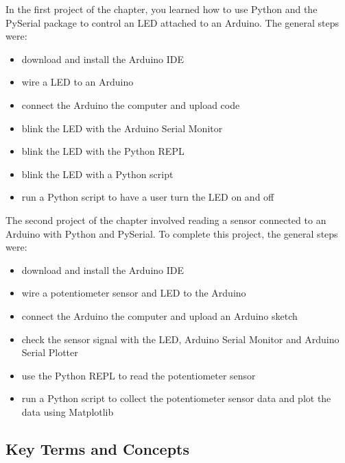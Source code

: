 \documentclass{book}
\providecommand{\tightlist}{%
      \setlength{\itemsep}{0pt}\setlength{\parskip}{0pt}}
\begin{document}
In the first project of the chapter, you learned how to use Python and
the PySerial package to control an LED attached to an Arduino. The
general steps were:

\begin{itemize}
\tightlist
\item
  download and install the Arduino IDE
\item
  wire a LED to an Arduino
\item
  connect the Arduino the computer and upload code
\item
  blink the LED with the Arduino Serial Monitor
\item
  blink the LED with the Python REPL
\item
  blink the LED with a Python script
\item
  run a Python script to have a user turn the LED on and off
\end{itemize}

The second project of the chapter involved reading a sensor connected to
an Arduino with Python and PySerial. To complete this project, the
general steps were:

\begin{itemize}
\tightlist
\item
  download and install the Arduino IDE
\item
  wire a potentiometer sensor and LED to the Arduino
\item
  connect the Arduino the computer and upload an Arduino sketch
\item
  check the sensor signal with the LED, Arduino Serial Monitor and
  Arduino Serial Plotter
\item
  use the Python REPL to read the potentiometer sensor
\item
  run a Python script to collect the potentiometer sensor data and plot
  the data using Matplotlib
\end{itemize}
    




    
        \hypertarget{key-terms-and-concepts}{%
\subsection{Key Terms and Concepts}\label{key-terms-and-concepts}}
    
\end{document}
